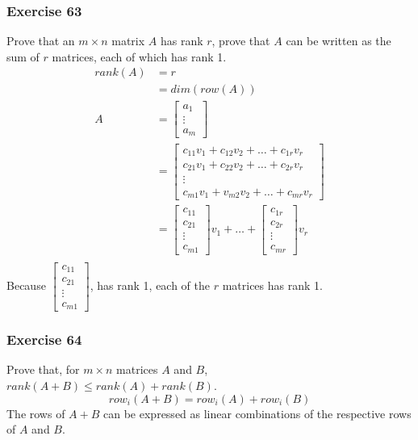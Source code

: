 \documentclass{math}
\begin{document}
\subsubsection*{Exercise 63}
Prove that an \( m\times n \) matrix \( A \) has rank \( r \), prove that
\( A \) can be written as the sum of \( r \) matrices, each of which has rank 1.
\begin{align*}
  rank(A) &= r \\
  &= dim(row(A)) \\
  A &= \begin{bmatrix}a_1 \\ \vdots \\ a_m\end{bmatrix} \\
  &= \begin{bmatrix}
    c_{11}v_1+c_{12}v_2+\dots+c_{1r}v_r \\
    c_{21}v_1+c_{22}v_2+\dots+c_{2r}v_r \\
    \vdots \\
    c_{m1}v_1+v_{m2}v_2+\dots+c_{mr}v_r
  \end{bmatrix} \\
  &= \begin{bmatrix}c_{11} \\ c_{21} \\ \vdots \\ c_{m1}\end{bmatrix}v_1+\dots+
    \begin{bmatrix}c_{1r} \\ c_{2r} \\ \vdots \\ c_{mr}\end{bmatrix}v_r \\
\end{align*}
Because \( \begin{bmatrix}c_{11} \\ c_{21} \\ \vdots \\ c_{m1}\end{bmatrix} \),
has rank 1, each of the \( r \) matrices has rank 1.

\subsubsection*{Exercise 64}
Prove that, for \( m\times n \) matrices \( A \) and \( B \), \( rank(A+B)\le
rank(A)+rank(B) \).
\[ row_i(A+B) = row_i(A)+row_i(B) \]
The rows of \( A+B \) can be expressed as linear combinations of the respective
rows of \( A \) and \( B \).
\end{document}
